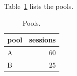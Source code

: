 \documentclass{article}
\begin{document}
Table~\ref{tab:a} lists the pools.
\begin{table}[t]
\caption{Pools.}
\label{tab:a}
\centering
\begin{tabular}{|l|r|}
\hline
pool & sessions \\
\hline
A & 60 \\
\hline
B & 25 \\
\hline
\end{tabular}
\end{table}
\end{document}
